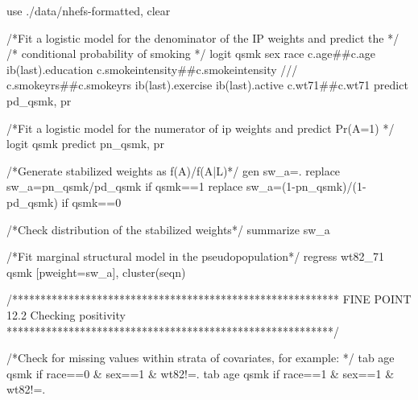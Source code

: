 \documentclass[
  10pt,
  a4paper,
]{book}
\newenvironment{Shaded}{\begin{snugshade}}{\end{snugshade}}
\newcommand{\CommentTok}[1]{\textcolor[rgb]{0.37,0.37,0.37}{#1}}
\newcommand{\FunctionTok}[1]{\textcolor[rgb]{0.28,0.35,0.67}{#1}}
\newcommand{\KeywordTok}[1]{\textcolor[rgb]{0.00,0.46,0.62}{#1}}
\newcommand{\NormalTok}[1]{\textcolor[rgb]{0.00,0.46,0.62}{#1}}
\begin{document}
\begin{Shaded}
\begin{Highlighting}[]
\KeywordTok{use}\NormalTok{ ./}\KeywordTok{data}\NormalTok{/nhefs{-}formatted, }\KeywordTok{clear}

\CommentTok{/*Fit a logistic model for the denominator of the IP weights and predict the */}
\CommentTok{/* conditional probability of smoking */}
\KeywordTok{logit}\NormalTok{ qsmk sex race c.age\#\#c.age ib(}\FunctionTok{last}\NormalTok{).education c.smokeintensity\#\#c.smokeintensity }\CommentTok{///}
\NormalTok{c.smokeyrs\#\#c.smokeyrs ib(}\FunctionTok{last}\NormalTok{).exercise ib(}\FunctionTok{last}\NormalTok{).active c.wt71\#\#c.wt71  }
\KeywordTok{predict}\NormalTok{ pd\_qsmk, pr}

\CommentTok{/*Fit a logistic model for the numerator of ip weights and predict Pr(A=1) */} 
\KeywordTok{logit}\NormalTok{ qsmk }
\KeywordTok{predict}\NormalTok{ pn\_qsmk, pr}

\CommentTok{/*Generate stabilized weights as f(A)/f(A|L)*/}
\KeywordTok{gen}\NormalTok{ sw\_a=.}
\KeywordTok{replace}\NormalTok{ sw\_a=pn\_qsmk/pd\_qsmk }\KeywordTok{if}\NormalTok{ qsmk==1}
\KeywordTok{replace}\NormalTok{ sw\_a=(1{-}pn\_qsmk)/(1{-}pd\_qsmk) }\KeywordTok{if}\NormalTok{ qsmk==0}

\CommentTok{/*Check distribution of the stabilized weights*/}
\KeywordTok{summarize}\NormalTok{ sw\_a}

\CommentTok{/*Fit marginal structural model in the pseudopopulation*/}
\KeywordTok{regress}\NormalTok{ wt82\_71 qsmk [}\KeywordTok{pweight}\NormalTok{=sw\_a], }\KeywordTok{cluster}\NormalTok{(seqn) }

\CommentTok{/**********************************************************}
\CommentTok{FINE POINT 12.2}
\CommentTok{Checking positivity}
\CommentTok{**********************************************************/}

\CommentTok{/*Check for missing values within strata of covariates, for example: */}
\KeywordTok{tab}\NormalTok{ age qsmk }\KeywordTok{if}\NormalTok{ race==0 \& sex==1 \& wt82!=.}
\KeywordTok{tab}\NormalTok{ age qsmk }\KeywordTok{if}\NormalTok{ race==1 \& sex==1 \& wt82!=.}
\end{Highlighting}
\end{Shaded}
\end{document}
